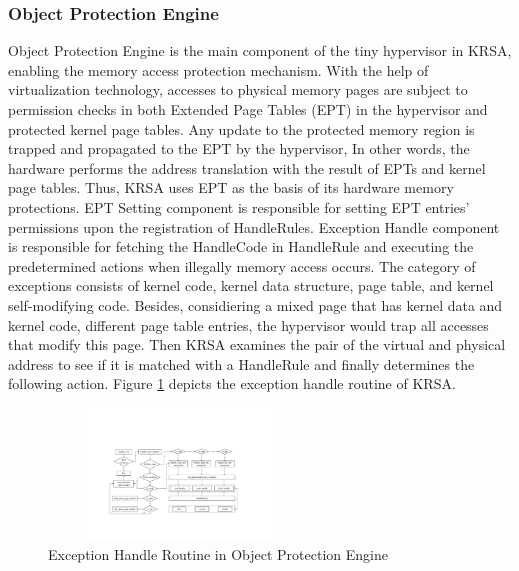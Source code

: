 \documentclass[conference]{IEEEtran}
\begin{document}
\subsubsection{Object Protection Engine} \label{sec:opedesign}
Object Protection Engine is the main component of the tiny hypervisor in KRSA, enabling the memory access protection mechanism.
With the help of virtualization technology, accesses to physical memory pages are subject to permission checks in both Extended Page Tables (EPT) in the hypervisor and protected kernel page tables. 
Any update to the protected memory region is trapped and propagated to the EPT by the hypervisor, In other words, the hardware performs the address translation with the result of EPTs and kernel page tables. Thus, KRSA uses EPT as the basis of its hardware memory protections.
EPT Setting component is responsible for setting EPT entries' permissions upon the registration of HandleRules. Exception Handle component is responsible for fetching the HandleCode in HandleRule and executing the predetermined actions when illegally memory access occurs. 
The category of exceptions consists of kernel code, kernel data structure, page table, and kernel self-modifying code. 
Besides, considiering a mixed page that has kernel data and kernel code, different page table entries, the hypervisor would trap all accesses that modify this page. Then KRSA examines the pair of the virtual and physical address to see if it is matched with a HandleRule and finally determines the following action. Figure \ref{pic:excep} depicts the exception handle routine of KRSA. 

\begin{figure}
    \centering
    \includegraphics[width=7cm, height=3.5cm]{pic/exception.pdf}
    \caption{Exception Handle Routine in Object Protection Engine}
    \label{pic:excep}
\end{figure}
\end{document}
